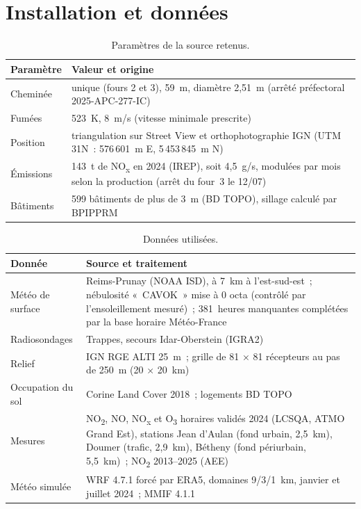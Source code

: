 \documentclass[11pt,a4paper]{article}
\newcommand{\NOx}{NO\textsubscript{x}}
\newcommand{\NOd}{NO\textsubscript{2}}
\begin{document}
\section{Installation et données}
\begin{table}[htbp]
\centering\small
\caption{Paramètres de la source retenus.}
\begin{tabularx}{\textwidth}{lY}
\toprule
Paramètre & Valeur et origine \\
\midrule
Cheminée & unique (fours 2 et 3), 59~m, diamètre 2,51~m (arrêté préfectoral 2025-APC-277-IC) \\
Fumées & 523~K, 8~m/s (vitesse minimale prescrite) \\
Position & triangulation sur Street View et orthophotographie IGN (UTM 31N~: 576\,601~m E, 5\,453\,845~m N) \\
Émissions & 143~t de \NOx{} en 2024 (IREP), soit 4,5~g/s, modulées par mois selon la production (arrêt du four~3 le 12/07) \\
Bâtiments & 599 bâtiments de plus de 3~m (BD TOPO), sillage calculé par BPIPPRM \\
\bottomrule
\end{tabularx}
\end{table}

\begin{table}[htbp]
\centering\small
\caption{Données utilisées.}
\begin{tabularx}{\textwidth}{lY}
\toprule
Donnée & Source et traitement \\
\midrule
Météo de surface & Reims-Prunay (NOAA ISD), à 7~km à l'est-sud-est~; nébulosité «~CAVOK~» mise à 0 octa (contrôlé par l'ensoleillement mesuré)~; 381~heures manquantes complétées par la base horaire Météo-France \\
Radiosondages & Trappes, secours Idar-Oberstein (IGRA2) \\
Relief & IGN RGE ALTI 25~m~; grille de 81 × 81 récepteurs au pas de 250~m (20 × 20~km) \\
Occupation du sol & Corine Land Cover 2018~; logements BD TOPO \\
Mesures & \NOd, NO, \NOx{} et O\textsubscript{3} horaires validés 2024 (LCSQA, ATMO Grand Est), stations Jean d'Aulan (fond urbain, 2,5~km), Doumer (trafic, 2,9~km), Bétheny (fond périurbain, 5,5~km)~; \NOd{} 2013–2025 (AEE) \\
Météo simulée & WRF 4.7.1 forcé par ERA5, domaines 9/3/1~km, janvier et juillet 2024~; MMIF 4.1.1 \\
\bottomrule
\end{tabularx}
\end{table}
\end{document}
